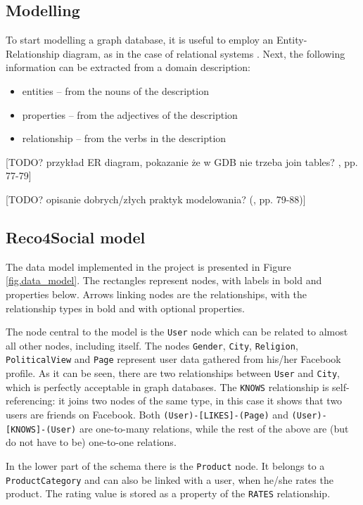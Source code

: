 \documentclass[12pt]{report}
\begin{document}
\subsection{Modelling}

To start modelling a graph database, it is useful to employ an Entity-Relationship diagram, as in the case of relational systems \cite{learning_neo4j}. Next, the following information can be extracted from a domain description:
\begin{itemize}
\item entities -- from the nouns of the description
\item properties -- from the adjectives of the description
\item relationship -- from the verbs in the description
\end{itemize}

[TODO? przykład ER diagram, pokazanie że w GDB nie trzeba join tables? \cite{learning_neo4j}, pp. 77-79]

[TODO? opisanie dobrych/złych praktyk modelowania? (\cite{learning_neo4j}, pp. 79-88)]

\subsection{Reco4Social model}

The data model implemented in the project is presented in Figure \ref{fig.data_model}. The rectangles represent nodes, with labels in bold and properties below. Arrows linking nodes are the relationships, with the relationship types in bold and with optional properties.

The node central to the model is the \texttt{User} node which can be related to almost all other nodes, including itself. The nodes \texttt{Gender}, \texttt{City}, \texttt{Religion}, \texttt{Political\-View} and \texttt{Page} represent user data gathered from his/her Facebook profile. As it can be seen, there are two relationships between \texttt{User} and \texttt{City}, which is perfectly acceptable in graph databases. The \texttt{KNOWS} relationship is self-referencing: it joins two nodes of the same type, in this case it shows that two users are friends on Facebook. Both \texttt{(User)-[LIKES]-(Page)} and \texttt{(User)-[KNOWS]-(User)} are one-to-many relations, while the rest of the above are (but do not have to be) one-to-one relations.

In the lower part of the schema there is the \texttt{Product} node. It belongs to a \texttt{Product\-Category} and can also be linked with a user, when he/she rates the product. The rating value is stored as a property of the \texttt{RATES} relationship. 
\end{document}

